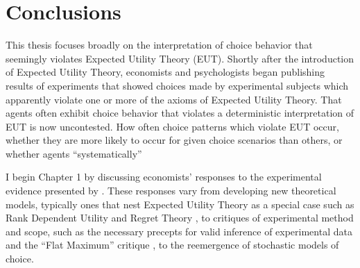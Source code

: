 \documentclass[../main.tex]{subfiles}
\begin{document}
\onehalfspacing
\setcounter{chapter}{4}

\chapter{Conclusions}

\lltoc %

This thesis focuses broadly on the interpretation of choice behavior that seemingly violates Expected Utility Theory (EUT).
Shortly after the introduction of Expected Utility Theory, economists and psychologists began publishing results of experiments that showed choices made by experimental subjects which apparently violate one or more of the axioms of Expected Utility Theory.
That agents often exhibit choice behavior that violates a deterministic interpretation of EUT is now uncontested.
How often choice patterns which violate EUT occur, whether they are more likely to occur for given choice scenarios than others, or whether agents \enquote{systematically}

I begin Chapter 1 by discussing economists' responses to the experimental evidence presented by \textcite{Grether1979}.
These responses vary from developing new theoretical models, typically ones that nest Expected Utility Theory as a special case such as Rank Dependent Utility \parencite{Quiggin1982} and Regret Theory \parencite{Bell1982, Loomes1982}, to critiques of experimental method and scope, such as the necessary precepts for valid inference of experimental data \parencite{Smith1982} and the \enquote{Flat Maximum} critique \parencite{Harrison1989, Harrison1992}, to the reemergence of stochastic models of choice.




\onlyinsubfile{
\newpage
\printbibliography[segment=5, heading=subbibliography]
}
\end{document}
